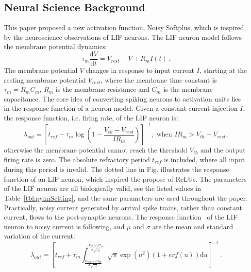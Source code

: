 \documentclass[runningheads,a4paper]{llncs}
\def\D{\mathrm{d}}
\begin{document}
\subsection{Neural Science Background}
This paper proposed a new activation function, Noisy Softplus, which is inspired by the neuroscience observations of LIF neurons.
The LIF neuron model follows the membrane potential dynamics:
\begin{equation}
\tau_m \frac{\D V}{\D t}=V_{rest} - V + R_{m} I(t) ~.
\label{eq:LIF}
\end{equation}
The membrane potential $V$ changes in response to input current $I$, starting at the resting membrane potential  $V_{rest}$, where the membrane time constant is $\tau_m = R_mC_m$, $R_m$ is the membrane resistance and $C_m$ is the membrane capacitance.
The core idea of converting spiking neurons to activation units lies in the response function of a neuron model.
Given a constant current injection $I$, the response function, i.e. firing rate, of the LIF neuron is:
\begin{equation}
\lambda_\mathit{out}=
\left [ t_\mathit{ref}-\tau_m\log \left ( 1-\frac{V_{th}-V_\mathit{rest}}{IR_m}  \right )\right ]^{-1}, \textrm{~when~} IR_m>V_{th}-V_{rest},
\label{equ:consI}
\end{equation}
otherwise the membrane potential cannot reach the threshold $V_{th}$ and the output firing rate is zero. 
The absolute refractory period $t_\mathit{ref}$ is included, where all input during this period is invalid.
The dotted line in Fig. illustrates the response function of an LIF neuron, which inspired the propose of ReLUs.
The parameters of the LIF neuron are all biologically valid, see the listed values in Table~\ref{tbl:pynnSetting}, and the same parameters are used throughout the paper.
Practically, noisy current generated by arrival spike trains, rather than constant current, flows to the post-synaptic neurons.
The response function~\cite{la2008response} of the LIF neuron to noisy current is following, and $\mu$ and $\sigma$ are the mean and standard variation of the current:
\begin{equation}
\lambda_\mathit{out}=
\left [ t_\mathit{ref}+\tau_m \int_{\frac{V_\mathit{rest}-\mu \tau_m }{\sigma \sqrt{\tau_m}}}^{\frac{V_{th}-\mu \tau_m }{\sigma \sqrt{\tau_m}}} \sqrt{\pi} \exp(u^{2}) (1+erf(u)) \D u \right ]^{-1} ~.
\label{equ:noiseI}
\end{equation}
\end{document}
